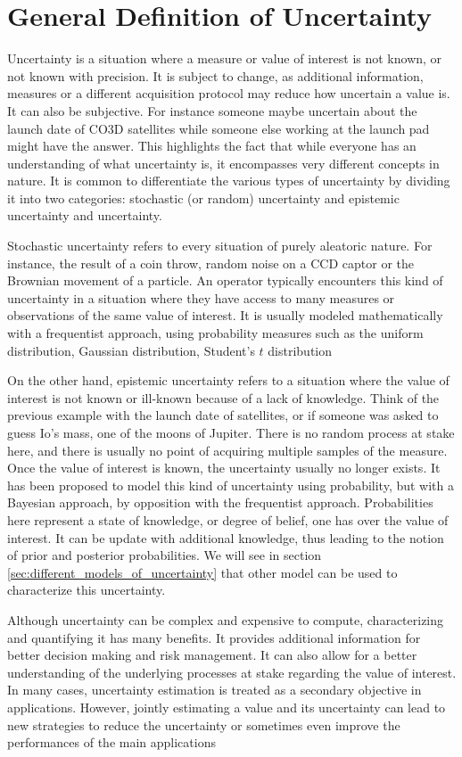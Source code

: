 \section{General Definition of Uncertainty}
Uncertainty is a situation where a measure or value of interest is not known, or not known with precision. It is subject to change, as additional information, measures or a different acquisition protocol may reduce how uncertain a value is. It can also be subjective. For instance someone maybe uncertain about the launch date of CO3D satellites while someone else working at the launch pad might have the answer. This highlights the fact that while everyone has an understanding of what uncertainty is, it encompasses very different concepts in nature. It is common to differentiate the various types of uncertainty by dividing it into two categories: stochastic (or random) uncertainty and epistemic uncertainty and  uncertainty.

Stochastic uncertainty refers to every situation of purely aleatoric nature. For instance, the result of a coin throw, random noise on a CCD captor or the Brownian movement of a particle. An operator typically encounters this kind of uncertainty in a situation where they have access to many measures or observations of the same value of interest. It is usually modeled mathematically with a frequentist approach, using probability measures such as the uniform distribution, Gaussian distribution, Student's $t$ distribution \etc 

On the other hand, epistemic uncertainty refers to a situation where the value of interest is not known or ill-known because of a lack of knowledge. Think of the previous example with the launch date of satellites, or if someone was asked to guess Io's mass, one of the moons of Jupiter. There is no random process at stake here, and there is usually no point of acquiring multiple samples of the measure. Once the value of interest is known, the uncertainty usually no longer exists. It has been proposed to model this kind of uncertainty using probability, but with a Bayesian approach, by opposition with the frequentist approach. Probabilities here represent a state of knowledge, or degree of belief, one has over the value of interest. It can be update with additional knowledge, thus leading to the notion of prior and posterior probabilities. We will see in section \ref{sec:different_models_of_uncertainty} that other model can be used to characterize this uncertainty. 

Although uncertainty can be complex and expensive to compute, characterizing and quantifying it has many benefits. It provides additional information for better decision making and risk management. It can also allow for a better understanding of the underlying processes at stake regarding the value of interest. In many cases, uncertainty estimation is treated as a secondary objective in applications. However, jointly estimating a value and its uncertainty can lead to new strategies to reduce the uncertainty or sometimes even improve the performances of the main applications 

